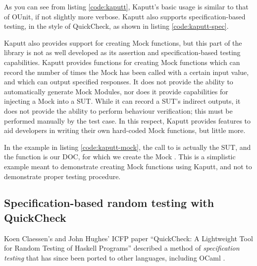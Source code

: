 As you can see from listing \ref{code:kaputt}, Kaputt's basic usage is
similar to that of OUnit, if not slightly more verbose. Kaputt also
supports specification-based testing, in the style of QuickCheck, as
shown in listing \ref{code:kaputt-spec}.



Kaputt also provides support for creating Mock functions, but this
part of the library is not as well developed as its assertion and
specification-based testing capabilities. Kaputt provides functions
for creating Mock functions which can record the number of times the
Mock has been called with a certain input value, and which can output
specified responses. It does not provide the ability to automatically
generate Mock Modules, nor does it provide capabilities for injecting
a Mock into a SUT. While it can record a SUT's indirect outputs, it
does not provide the ability to perform behaviour verification; this
must be performed manually by the test case. In this respect, Kaputt
provides features to aid developers in writing their own hard-coded
Mock functions, but little more.




In the example in listing \ref{code:kaputt-mock}, the call to
 is actually the SUT, and the function  is
our DOC, for which we create the Mock . This is a simplistic
example meant to demonstrate creating Mock functions using Kaputt, and
not to demonstrate proper testing procedure.

\subsection{Specification-based random testing with QuickCheck}

Koen Claessen's and John Hughes' ICFP paper ``QuickCheck: A
Lightweight Tool for Random Testing of Haskell Programs''
\cite{claessen:quickcheck} described a method of \textit{specification
  testing} that has since been ported to other languages, including
OCaml \cite{code:ocaml-quickcheck} \cite{www:kaputt}.

